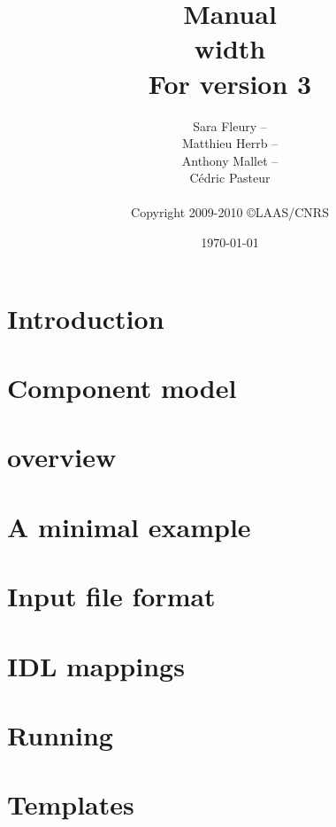 \documentclass[a4paper,11pt]{book}
\title{{\Huge\bfseries \GenoM{} Manual}\\ \vrule height 2pt width \linewidth\\
         \hfill\small For \GenoM{} version 3}
\author{
   Sara Fleury -- {\email{sara.fleury@laas.fr}}\\
   Matthieu Herrb -- {\email{matthieu.herrb@laas.fr}}\\
   Anthony Mallet -- {\email{anthony.mallet@laas.fr}}\\
   C\'edric Pasteur\\
   \hfill\\
   Copyright 2009-2010 \copyright LAAS/CNRS
}
\date{\today}
\begin{document}

\frontmatter
\maketitle
\tableofcontents
\mainmatter

\chapter{Introduction}

\chapter{Component model}
\label{chapter:model}

\chapter{\GenoM{} overview}
\label{chapter:genom}

\chapter{A minimal example}

\chapter{Input file format}
\label{chapter:iff}


\chapter{\GenoM{} IDL mappings}
\label{chapter:mappings}


\chapter{Running \GenoM{}}
\label{chapter:run}


\chapter{Templates}
\label{chapter:tmpl}


\backmatter

\printindex
\end{document}
